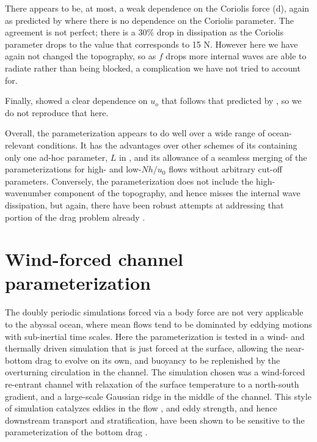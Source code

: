 \documentclass[twocol]{ametsocV5}
\begin{document}
There appears to be, at most, a weak dependence on the Coriolis force (d), again as predicted by  where there is no dependence on the Coriolis parameter.  The agreement is not perfect; there is a 30\% drop in dissipation as the Coriolis parameter drops to the value that corresponds to 15 N.  However here we have again not changed the topography, so as $f$ drops more internal waves are able to radiate rather than being blocked, a complication we have not tried to account for.

Finally, \citet{klymak18} showed a clear dependence on $u_o$  that follows that predicted by , so we do not reproduce that here.

Overall, the parameterization appears to do well over a wide range of ocean-relevant conditions.  It has the advantages over other schemes of its containing only one ad-hoc parameter, $L$ in , and its allowance of a seamless merging of the parameterizations for high- and low-$Nh/u_0$ flows without arbitrary cut-off parameters.  Conversely, the parameterization does not include the high-wavenumber component of the topography, and hence misses the internal wave dissipation, but again, there have been robust attempts at addressing  that portion of the drag problem already \citep{nikurashinferrari14}.

\section{Wind-forced channel parameterization}
\label{sec:ResultsWindForcing}

The doubly periodic simulations forced via a body force are not very applicable to the abyssal ocean, where mean flows tend to be dominated by eddying motions with sub-inertial time scales.  Here the parameterization is tested in a wind- and thermally driven simulation that is just forced at the surface, allowing the near-bottom drag to evolve on its own, and buoyancy to be replenished by the overturning circulation in the channel.  The simulation chosen was a wind-forced re-entrant channel with relaxation of the surface temperature to a north-south gradient, and a large-scale Gaussian ridge in the middle of the channel.  This style of simulation catalyzes eddies in the flow \citep{abernatheycessi14}, and eddy strength, and hence downstream transport and stratification, have been shown to be sensitive to the parameterization of the bottom drag \citep{Marshall_2017}.
\end{document}

